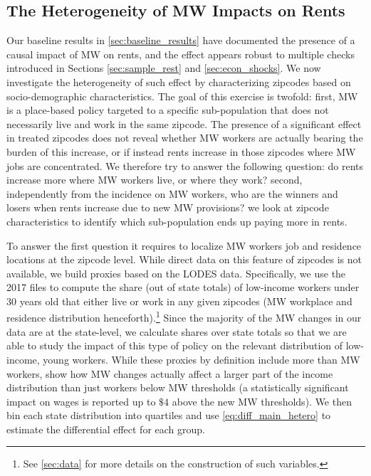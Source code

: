 \subsection{The Heterogeneity of MW Impacts on Rents}\label{sec:heter}

Our baseline results in \autoref{sec:baseline_results} have documented the presence of a causal 
impact of MW on rents, and the effect appears robust to multiple checks introduced in Sections 
\ref{sec:sample_rest} and \ref{sec:econ_shocks}. We now investigate the heterogeneity of such effect 
by characterizing zipcodes based on socio-demographic characteristics. The goal of this exercise is 
twofold: first, MW is a place-based policy targeted to a specific sub-population that does not 
necessarily live and work in the same zipcode. The presence of a significant effect in treated 
zipcodes does not reveal whether MW workers are actually bearing the burden of this increase, or if 
instead rents increase in those zipcodes where MW jobs are concentrated. We therefore try to answer 
the following question: do rents increase more where MW workers live, or where they work? second, 
independently from the incidence on MW workers, who are the winners and losers when rents increase 
due to new MW provisions? we look at zipcode characteristics to identify which sub-population ends 
up paying more in rents.

To answer the first question it requires to localize MW workers job and residence locations at the 
zipcode level. While direct data on this feature of zipcodes is not available, we build proxies 
based on the LODES data. Specifically, we use the 2017 files to compute the share (out of state 
totals) of low-income workers under 30 years old that either live or work in any given zipcodes (MW 
workplace and residence distribution henceforth).\footnote{See \autoref{sec:data} for more details 
	on the construction of such variables.} 
Since the majority of the MW changes in our data are at the state-level, we calculate shares over 
state totals so that we are able to study the impact of this type of policy on the relevant 
distribution of low-income, young workers. While these proxies by definition include more than MW 
workers, \cite{dube2016minimum} show how MW changes actually affect a larger part of the income 
distribution than just workers below MW thresholds (a statistically significant impact on wages is 
reported up to $\$4$ above the new MW thresholds). We then bin each state distribution into quartiles 
and use \autoref{eq:diff_main_hetero} to estimate the differential effect for each group.


